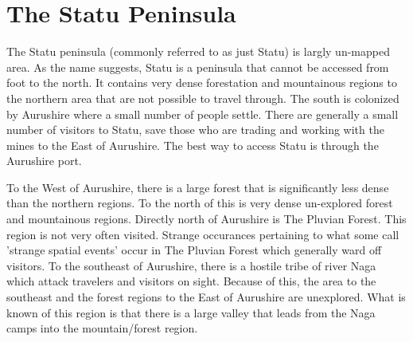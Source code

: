 \section{The Statu Peninsula}

The Statu peninsula (commonly referred to as just Statu) is largly un-mapped area. As the name suggests, Statu is a peninsula that cannot be accessed from foot to the north. It contains very dense forestation and mountainous regions to the northern area that are not possible to travel through. The south is colonized by Aurushire where a small number of people settle. There are generally a small number of visitors to Statu, save those who are trading and working with the mines to the East of Aurushire. The best way to access Statu is through the Aurushire port.

To the West of Aurushire, there is a large forest that is significantly less dense than the northern regions. To the north of this is very dense un-explored forest and mountainous regions. Directly north of Aurushire is The Pluvian Forest. This region is not very often visited. Strange occurances pertaining to what some call 'strange spatial events' occur in The Pluvian Forest which generally ward off visitors. To the southeast of Aurushire, there is a hostile tribe of river Naga which attack travelers and visitors on sight. Because of this, the area to the southeast and the forest regions to the East of Aurushire are unexplored. What is known of this region is that there is a large valley that leads from the Naga camps into the mountain/forest region.